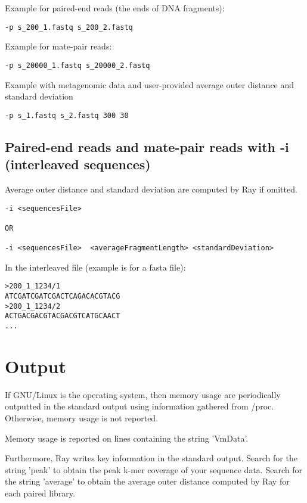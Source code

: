 \documentclass{article}
\begin{document}
Example for paired-end reads (the ends of DNA fragments):

\begin{verbatim}
-p s_200_1.fastq s_200_2.fastq
\end{verbatim}

Example for mate-pair reads:

\begin{verbatim}
-p s_20000_1.fastq s_20000_2.fastq
\end{verbatim}

Example with metagenomic data and user-provided average outer distance and standard deviation

\begin{verbatim}
-p s_1.fastq s_2.fastq 300 30
\end{verbatim}

\subsection{Paired-end reads and mate-pair reads with -i (interleaved sequences)}


Average outer distance and standard deviation are computed by Ray if omitted.

\begin{verbatim}
-i <sequencesFile>

OR

-i <sequencesFile>  <averageFragmentLength> <standardDeviation> 
\end{verbatim}

In the interleaved file (example is for a fasta file):

\begin{verbatim}
>200_1_1234/1
ATCGATCGATCGACTCAGACACGTACG
>200_1_1234/2
ACTGACGACGTACGACGTCATGCAACT
...
\end{verbatim}



\section{Output}

If GNU/Linux is the operating system, then memory usage are periodically outputted in the 
standard output using information gathered from /proc. Otherwise, memory usage is not reported.

Memory usage is reported on lines containing the string 'VmData'.

Furthermore, Ray writes key information in the standard output.
Search for the string 'peak' to obtain the peak k-mer coverage of your sequence data.
Search for the string 'average' to obtain the average outer distance computed by Ray
for each paired library.
\end{document}
